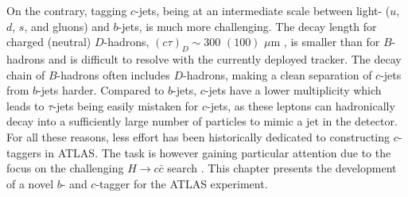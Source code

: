 On the contrary, tagging $c$-jets, being at an intermediate scale between light- ($u$, $d$, $s$, and gluons) and $b$-jets, is much more challenging. The decay length for charged (neutral) $D$-hadrons, $(c\tau)_D \sim 300$ $(100)$ $\mu$m \cite{Tanabashi:2018oca}, is smaller than for $B$-hadrons and is difficult to resolve with the currently deployed tracker. The decay chain of $B$-hadrons often includes $D$-hadrons, making a clean separation of $c$-jets from $b$-jets harder. Compared to $b$-jets, $c$-jets have a lower multiplicity which leads to $\tau$-jets being easily mistaken for $c$-jets, as these leptons can hadronically decay into a sufficiently large number of particles to mimic a jet in the detector. For all these reasons, less effort has been historically dedicated to constructing $c$-taggers in ATLAS. The task is however gaining particular attention due to the focus on the challenging $H \rightarrow c\bar{c}$ search \cite{Aaboud:2018fhh}. This chapter presents the development of a novel $b$- and $c$-tagger for the ATLAS experiment.

